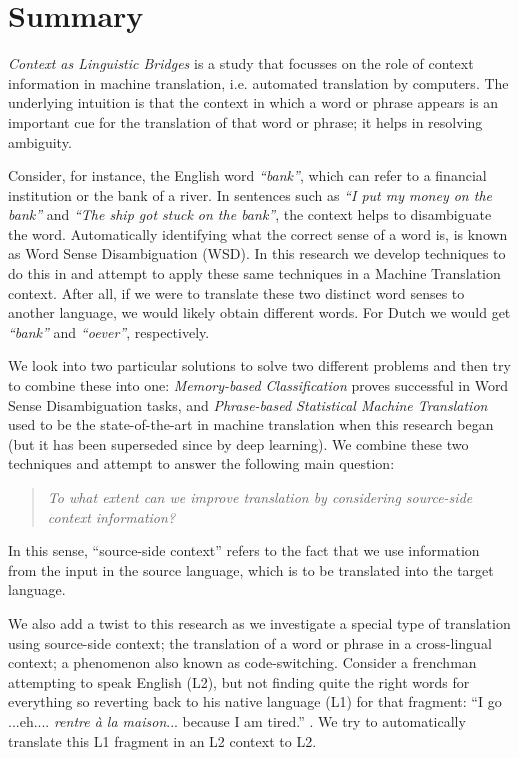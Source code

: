 \chapter*{Summary}

\emph{Context as Linguistic Bridges} is a study that focusses on the role of
context information in machine translation, i.e. automated translation by computers.  The
underlying intuition is that the context in which a word or phrase appears is
an important cue for the translation of that word or phrase; it helps in
resolving ambiguity.

Consider, for instance, the English word \emph{``bank''}, which can refer to a
financial institution or the bank of a river. In sentences such as \emph{``I
put my money on the bank''} and \emph{``The ship got stuck on the bank''}, the
context helps to disambiguate the word. Automatically identifying what the correct sense of a word is, is known as Word Sense
Disambiguation (WSD). In this research we develop techniques to do this
in and attempt to apply these same techniques in a Machine
Translation context. After all, if we were to translate these two distinct
word senses to another language, we would likely obtain different words. For
Dutch we would get \emph{``bank''} and \emph{``oever''}, respectively.

We look into two particular solutions to solve two different problems and then
try to combine these into one: \emph{Memory-based Classification} proves
successful in Word Sense Disambiguation tasks, and \emph{Phrase-based
Statistical Machine Translation} used to be the state-of-the-art in machine
translation when this research began (but it has been superseded since by deep
learning). We combine these two techniques and attempt to answer the following main
question:

\begin{quote}
\emph{To what extent can we improve translation by considering source-side context information?}
\end{quote}

In this sense, ``source-side context'' refers to the fact that we use
information from the input in the source language, which is to be translated
into the target language.

We also add a twist to this research as we investigate a special type of
translation using source-side context; the translation of a word or phrase in a
cross-lingual context; a phenomenon also known as code-switching. Consider a
frenchman attempting to speak English (L2), but not finding quite the right
words for everything so reverting back to his native language (L1) for that
fragment: ``I go ...eh.... \emph{rentre à la maison}... because I am tired.''
. We try to automatically translate this L1 fragment in an L2 context to L2.


